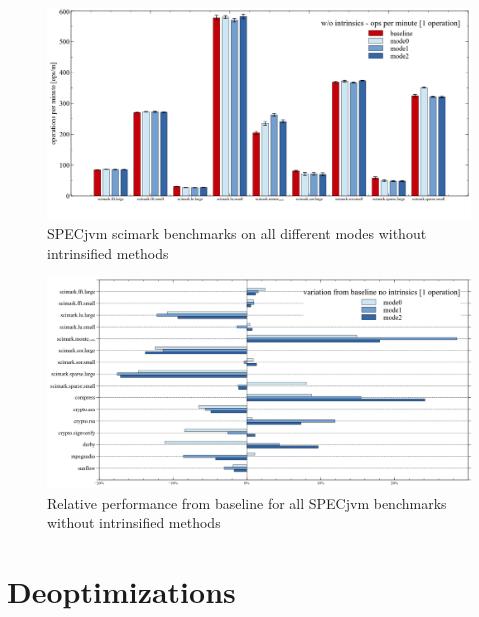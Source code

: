 \begin{figure}[ht]
  \begin{center}
    \centering
    \includegraphics[width=1.0\textwidth]{figures/scimark_warmup_nointrinsics.png}
    \caption{SPECjvm scimark benchmarks on all different modes without intrinsified methods}
    \label{f:scimark_warmup_nointrinsics}
  \end{center}
\end{figure}


\begin{figure}[ht]
  \begin{center}
    \centering
    \includegraphics[width=1.0\textwidth]{figures/all_warmup_nointrinsics_variation.png}
    \caption{Relative performance from baseline for all SPECjvm benchmarks without intrinsified methods}
    \label{f:all_warmup_nointrinsics_variation}
  \end{center}
\end{figure}




\section{Deoptimizations}
\label{s:perf_deoptimizations}

